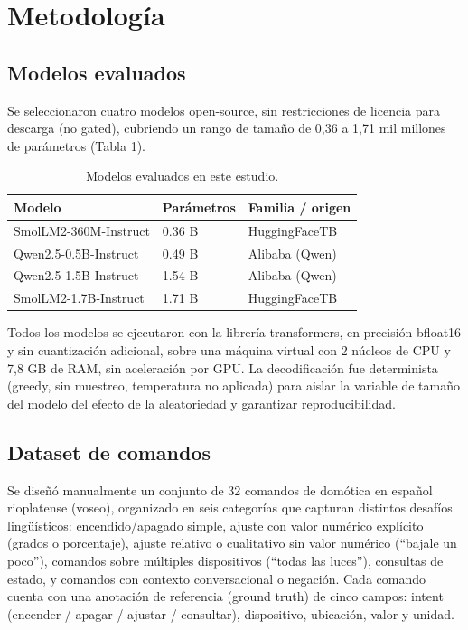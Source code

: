 \section{Metodología}

\subsection{Modelos evaluados}

Se seleccionaron cuatro modelos open-source, sin restricciones de licencia
para descarga (no gated), cubriendo un rango de tamaño de 0,36 a 1,71 mil
millones de parámetros (Tabla 1).

\begin{table}[htbp]
\centering
\caption{Modelos evaluados en este estudio.}
\label{tab:orig-modelos}
\begin{tabular}{lll}
\toprule
Modelo & Parámetros & Familia / origen \\
\midrule
SmolLM2-360M-Instruct & 0.36 B & HuggingFaceTB \\
Qwen2.5-0.5B-Instruct  & 0.49 B & Alibaba (Qwen) \\
Qwen2.5-1.5B-Instruct  & 1.54 B & Alibaba (Qwen) \\
SmolLM2-1.7B-Instruct  & 1.71 B & HuggingFaceTB \\
\bottomrule
\end{tabular}
\end{table}

Todos los modelos se ejecutaron con la librería transformers, en precisión
bfloat16 y sin cuantización adicional, sobre una máquina virtual con 2
núcleos de CPU y 7,8 GB de RAM, sin aceleración por GPU. La decodificación
fue determinista (greedy, sin muestreo, temperatura no aplicada) para
aislar la variable de tamaño del modelo del efecto de la aleatoriedad y
garantizar reproducibilidad.

\subsection{Dataset de comandos}

Se diseñó manualmente un conjunto de 32 comandos de domótica en español
rioplatense (voseo), organizado en seis categorías que capturan distintos
desafíos lingüísticos: encendido/apagado simple, ajuste con valor numérico
explícito (grados o porcentaje), ajuste relativo o cualitativo sin valor
numérico (``bajale un poco''), comandos sobre múltiples dispositivos
(``todas las luces''), consultas de estado, y comandos con contexto
conversacional o negación. Cada comando cuenta con una anotación de
referencia (ground truth) de cinco campos: intent (encender / apagar /
ajustar / consultar), dispositivo, ubicación, valor y unidad.

